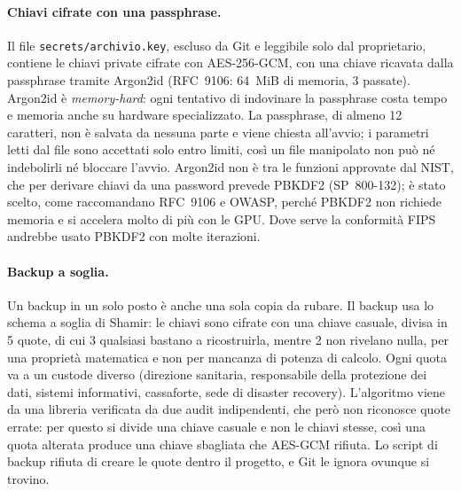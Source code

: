 \paragraph{Chiavi cifrate con una passphrase.} Il file \texttt{secrets/archivio.key}, escluso da Git e leggibile solo dal proprietario, contiene le chiavi private cifrate con AES-256-GCM, con una chiave ricavata dalla passphrase tramite Argon2id (RFC~9106\cite{rfc9106}: 64~MiB di memoria, 3 passate). Argon2id è \emph{memory-hard}: ogni tentativo di indovinare la passphrase costa tempo e memoria anche su hardware specializzato. La passphrase, di almeno 12 caratteri, non è salvata da nessuna parte e viene chiesta all'avvio; i parametri letti dal file sono accettati solo entro limiti, così un file manipolato non può né indebolirli né bloccare l'avvio. Argon2id non è tra le funzioni approvate dal NIST, che per derivare chiavi da una password prevede PBKDF2 (SP~800-132\cite{sp800-132}); è stato scelto, come raccomandano RFC~9106 e OWASP\cite{owasp-password}, perché PBKDF2 non richiede memoria e si accelera molto di più con le GPU. Dove serve la conformità FIPS andrebbe usato PBKDF2 con molte iterazioni.

\paragraph{Backup a soglia.} Un backup in un solo posto è anche una sola copia da rubare. Il backup usa lo schema a soglia di Shamir\cite{shamir}: le chiavi sono cifrate con una chiave casuale, divisa in 5 quote, di cui 3 qualsiasi bastano a ricostruirla, mentre 2 non rivelano nulla, per una proprietà matematica e non per mancanza di potenza di calcolo. Ogni quota va a un custode diverso (direzione sanitaria, responsabile della protezione dei dati, sistemi informativi, cassaforte, sede di disaster recovery). L'algoritmo viene da una libreria verificata da due audit indipendenti\cite{privy-sss}, che però non riconosce quote errate: per questo si divide una chiave casuale e non le chiavi stesse, così una quota alterata produce una chiave sbagliata che AES-GCM rifiuta. Lo script di backup rifiuta di creare le quote dentro il progetto, e Git le ignora ovunque si trovino.

